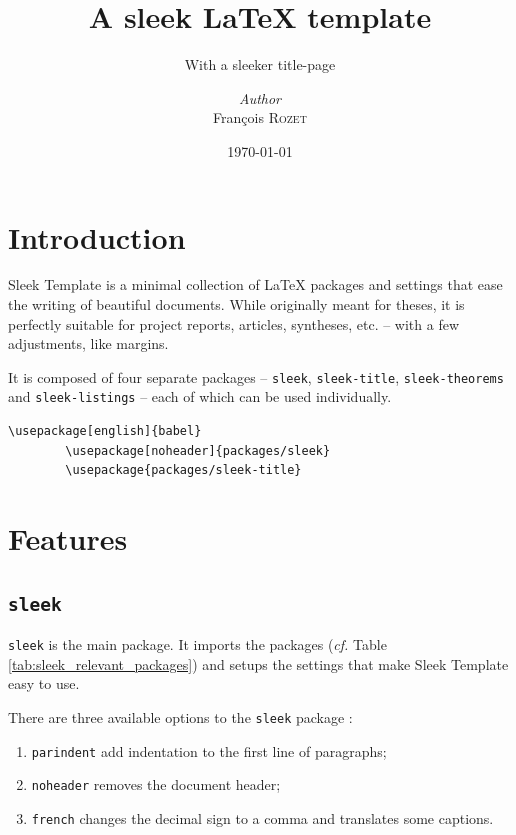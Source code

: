 \documentclass[12pt]{report}
\institute{Random University}
\title{A sleek \LaTeX{} template}
\subtitle{With a sleeker title-page}
\author{\textit{Author}\\François \textsc{Rozet}}
\date{\today}
\begin{document}
    \maketitle
    \romantableofcontents

    \chapter{Introduction}

    Sleek Template is a minimal collection of \LaTeX{} packages and settings that ease the writing of beautiful documents. While originally meant for theses, it is perfectly suitable for project reports, articles, syntheses, etc. -- with a few adjustments, like margins.

    It is composed of four separate packages -- \texttt{sleek}, \texttt{sleek-title}, \texttt{sleek-theorems} and \texttt{sleek-listings} -- each of which can be used individually.

    \begin{lstlisting}[style=latexFrameTB, caption={Example of Sleek Template packages usage.}, gobble=8]
        \usepackage[english]{babel}
        \usepackage[noheader]{packages/sleek}
        \usepackage{packages/sleek-title}
    \end{lstlisting}


    \chapter{Features}

    \section{\texttt{sleek}}

    \texttt{sleek} is the main package. It imports the packages (\emph{cf.} Table \ref{tab:sleek_relevant_packages}) and setups the settings that make Sleek Template easy to use.

    There are three available options to the \texttt{sleek} package :

    \begin{enumerate}[noitemsep]
        \item \texttt{parindent} add indentation to the first line of paragraphs;
        \item \texttt{noheader} removes the document header;
        \item \texttt{french} changes the decimal sign to a comma and translates some captions.
    \end{enumerate}
\end{document}
